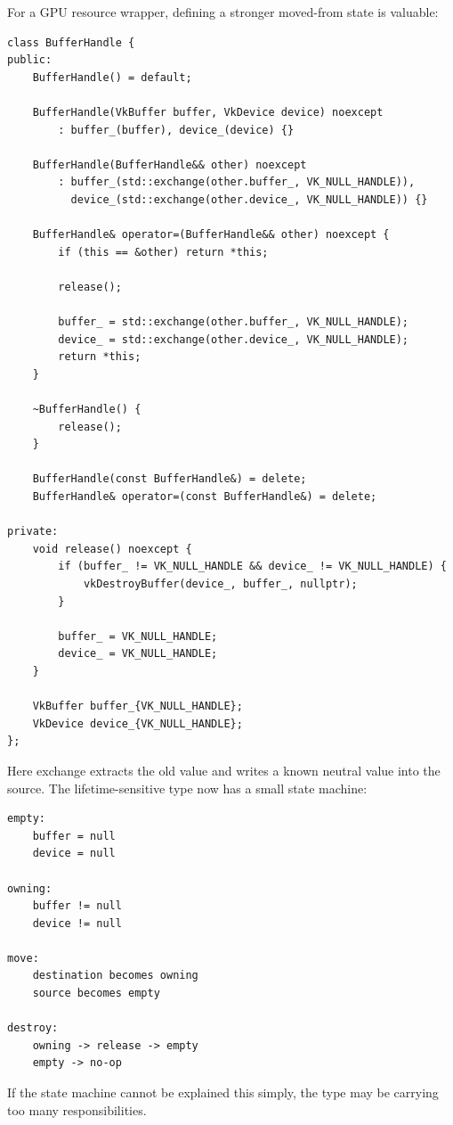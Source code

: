 For a GPU resource wrapper, defining a stronger moved-from state is valuable:

\begin{verbatim}
class BufferHandle {
public:
    BufferHandle() = default;

    BufferHandle(VkBuffer buffer, VkDevice device) noexcept
        : buffer_(buffer), device_(device) {}

    BufferHandle(BufferHandle&& other) noexcept
        : buffer_(std::exchange(other.buffer_, VK_NULL_HANDLE)),
          device_(std::exchange(other.device_, VK_NULL_HANDLE)) {}

    BufferHandle& operator=(BufferHandle&& other) noexcept {
        if (this == &other) return *this;

        release();

        buffer_ = std::exchange(other.buffer_, VK_NULL_HANDLE);
        device_ = std::exchange(other.device_, VK_NULL_HANDLE);
        return *this;
    }

    ~BufferHandle() {
        release();
    }

    BufferHandle(const BufferHandle&) = delete;
    BufferHandle& operator=(const BufferHandle&) = delete;

private:
    void release() noexcept {
        if (buffer_ != VK_NULL_HANDLE && device_ != VK_NULL_HANDLE) {
            vkDestroyBuffer(device_, buffer_, nullptr);
        }

        buffer_ = VK_NULL_HANDLE;
        device_ = VK_NULL_HANDLE;
    }

    VkBuffer buffer_{VK_NULL_HANDLE};
    VkDevice device_{VK_NULL_HANDLE};
};
\end{verbatim}

Here exchange extracts the old value and writes a known neutral value into the source. The lifetime-sensitive type now has a small state machine:

\begin{verbatim}
empty:
    buffer = null
    device = null

owning:
    buffer != null
    device != null

move:
    destination becomes owning
    source becomes empty

destroy:
    owning -> release -> empty
    empty -> no-op
\end{verbatim}

If the state machine cannot be explained this simply, the type may be carrying too many responsibilities.

